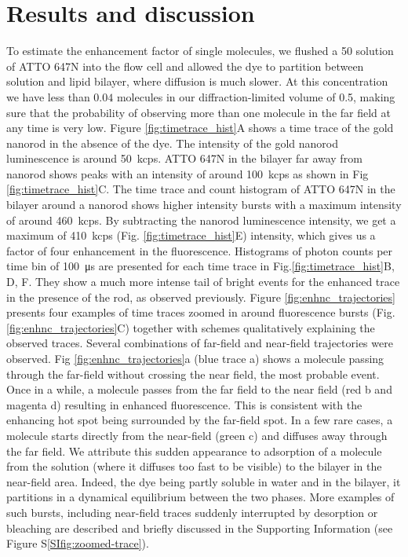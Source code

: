 \section{Results and discussion}
To estimate the enhancement factor of single molecules, we flushed a \SI{50}{\pM} solution of ATTO 647N into the flow cell and allowed the dye to partition between solution and lipid bilayer, where diffusion is much slower.
At this concentration we have less than $0.04$ molecules in our diffraction-limited volume of \SI{0.5}{\fL}, making sure that the probability of observing more than one molecule in the far field at any time is very low.
Figure \ref{fig:timetrace_hist}A shows a time trace of the gold nanorod in the absence of the dye.
The intensity of the gold nanorod luminescence is around \SI{50}{kcps}.
ATTO 647N in the bilayer far away from nanorod shows peaks with an intensity of around \SI{100}{kcps} as shown in Fig \ref{fig:timetrace_hist}C.
The time trace and count histogram of ATTO 647N in the bilayer around a nanorod shows higher intensity bursts with a maximum intensity of around \SI{460}{kcps}. 
By subtracting the nanorod luminescence intensity, we get a maximum of \SI{410}{kcps} (Fig. \ref{fig:timetrace_hist}E) intensity, which gives us a factor of four enhancement in the fluorescence. Histograms of photon counts per time bin of \SI{100}{\us} are presented for each time trace in Fig.\ref{fig:timetrace_hist}B, D, F. 
They show a much more intense tail of bright events for the enhanced trace in the presence of the rod, as observed previously.\cite{khatua2014resonant}
Figure \ref{fig:enhnc_trajectories} presents four examples of time traces zoomed in around fluorescence bursts (Fig. \ref{fig:enhnc_trajectories}C) together with schemes qualitatively explaining the observed traces.
Several combinations of far-field and near-field trajectories were observed.
Fig \ref{fig:enhnc_trajectories}a (blue trace a) shows a molecule passing through the far-field without crossing the near field, the most probable event.
Once in a while, a molecule passes from the far field to the near field (red b and magenta d) resulting in enhanced fluorescence.
This is consistent with the enhancing hot spot being surrounded by the far-field spot.
In a few rare cases, a molecule starts directly from the near-field (green c) and diffuses away through the far field.
We attribute this sudden appearance to adsorption of a molecule from the solution (where it diffuses too fast to be visible) to the bilayer in the near-field area.
Indeed, the dye being partly soluble in water and in the bilayer, it partitions in a dynamical equilibrium between the two phases.
More examples of such bursts, including near-field traces suddenly interrupted by desorption or bleaching are described and briefly discussed in the Supporting Information (see Figure S\ref{SIfig:zoomed-trace}).

